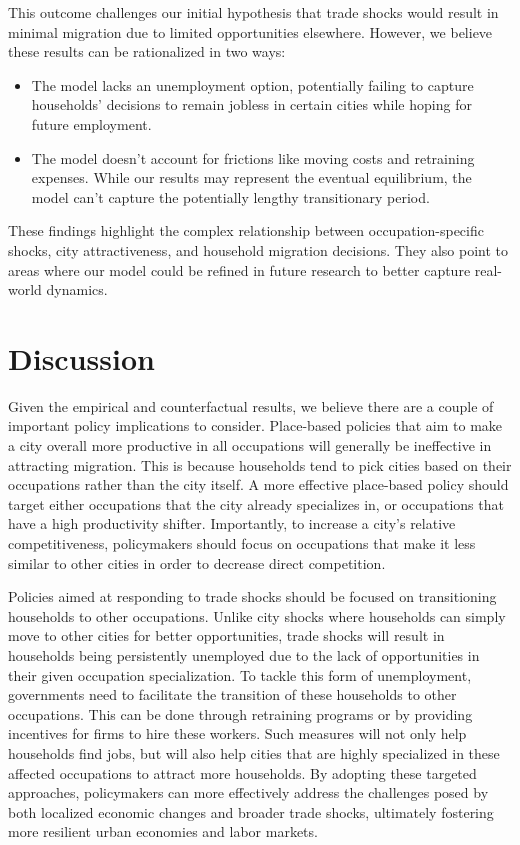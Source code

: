 \documentclass[10pt]{article}
\begin{document}
This outcome challenges our initial hypothesis that trade shocks would result in minimal migration due to limited opportunities elsewhere. However, we believe these results can be rationalized in two ways:

\begin{itemize}
    \item The model lacks an unemployment option, potentially failing to capture households' decisions to remain jobless in certain cities while hoping for future employment.
    \item The model doesn't account for frictions like moving costs and retraining expenses. While our results may represent the eventual equilibrium, the model can't capture the potentially lengthy transitionary period.
\end{itemize}

These findings highlight the complex relationship between occupation-specific shocks, city attractiveness, and household migration decisions. They also point to areas where our model could be refined in future research to better capture real-world dynamics.

\section{Discussion}

Given the empirical and counterfactual results, we believe there are a couple of important policy implications to consider. Place-based policies that aim to make a city overall more productive in all occupations will generally be ineffective in attracting migration. This is because households tend to pick cities based on their occupations rather than the city itself. A more effective place-based policy should target either occupations that the city already specializes in, or occupations that have a high productivity shifter. Importantly, to increase a city's relative competitiveness, policymakers should focus on occupations that make it less similar to other cities in order to decrease direct competition.

Policies aimed at responding to trade shocks should be focused on transitioning households to other occupations. Unlike city shocks where households can simply move to other cities for better opportunities, trade shocks will result in households being persistently unemployed due to the lack of opportunities in their given occupation specialization. To tackle this form of unemployment, governments need to facilitate the transition of these households to other occupations. This can be done through retraining programs or by providing incentives for firms to hire these workers. Such measures will not only help households find jobs, but will also help cities that are highly specialized in these affected occupations to attract more households. By adopting these targeted approaches, policymakers can more effectively address the challenges posed by both localized economic changes and broader trade shocks, ultimately fostering more resilient urban economies and labor markets.
\end{document}
